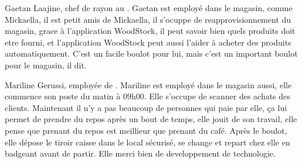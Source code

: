 Gaetan Laajine, chef de rayon au \fm.\crlf
Gaetan est employé dans le magasin, comme Mickaella, il est petit amis de Mickaella, il s'ocuppe de reapprovisionnement du magasin, grace à l'application WoodStock, il peut savoir bien quels produits doit etre fourni, et l'application WoodStock peut aussi l'aider à acheter des produits automatiquement. C'est un facile boulot pour lui, mais c'est un important boulot pour le magasin, il dit.
\stopfiguretext

Mariline Gerussi, employée de \fm.\crlf
Mariline est employé dans le magasin aussi, elle commence son poste du matin à 09h00. Elle s'occupe de scanner des achats des clients. Maintenant il n'y a pas beaucoup de personnes qui paie par elle, ça lui permet de prendre du repos après un bout de temps, elle jouit de son travail, elle pense que prenant du repos est meillieur que prenant du café. Après le boulot, elle dépose le tiroir caisse dans le local sécurisé, se change et repart chez elle en badgeant avant de partir. Elle merci bien de developpement de technologie.
\stopfiguretext
